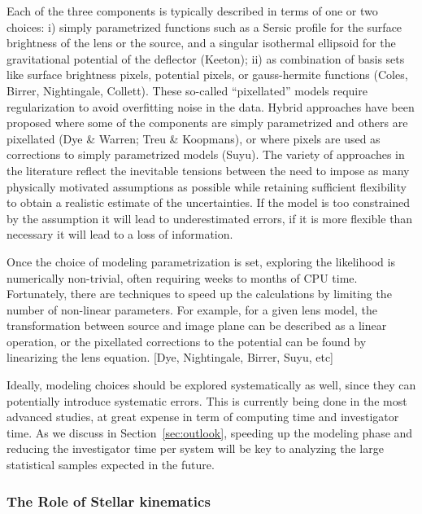 Each of the three components is typically described in terms of one or
two choices: i) simply parametrized functions such as a Sersic profile
for the surface brightness of the lens or the source, and a singular
isothermal ellipsoid for the gravitational potential of the deflector
(Keeton); ii) as combination of basis sets like surface brightness
pixels, potential pixels, or gauss-hermite functions (Coles, Birrer,
Nightingale, Collett). These so-called ``pixellated'' models require
regularization to avoid overfitting noise in the data. Hybrid
approaches have been proposed where some of the components are simply
parametrized and others are pixellated (Dye \& Warren; Treu \&
Koopmans), or where pixels are used as corrections to simply
parametrized models (Suyu). The variety of approaches in the
literature reflect the inevitable tensions between the need to impose
as many physically motivated assumptions as possible while retaining
sufficient flexibility to obtain a realistic estimate of the
uncertainties. If the model is too constrained by the assumption it
will lead to underestimated errors, if it is more flexible than
necessary it will lead to a loss of information.

Once the choice of modeling parametrization is set, exploring the
likelihood is numerically non-trivial, often requiring weeks to months
of CPU time. Fortunately, there are techniques to speed up the
calculations by limiting the number of non-linear parameters. For
example, for a given lens model, the transformation between source and
image plane can be described as a linear operation, or the pixellated
corrections to the potential can be found by linearizing the lens
equation. [Dye, Nightingale, Birrer, Suyu, etc]

Ideally, modeling choices should be explored systematically as well,
since they can potentially introduce systematic errors. This is
currently being done in the most advanced studies, at great expense in
term of computing time and investigator time. As we discuss in
Section~\ref{sec:outlook}, speeding up the modeling phase and reducing
the investigator time per system will be key to analyzing the large
statistical samples expected in the future.


\subsubsection{The Role of Stellar kinematics}

